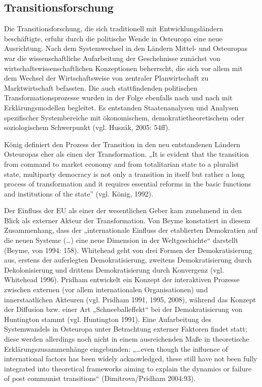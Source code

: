 \subsection{Transitionsforschung}
Die Transitionsforschung, die sich traditionell mit Entwicklungsländern beschäftigte, erfuhr durch die politische Wende in Osteuropa eine neue Ausrichtung. Nach dem Systemwechsel in den Ländern Mittel- und Osteuropas war die wissenschaftliche Aufarbeitung der Geschehnisse zunächst von wirtschaftswissenschaftlichen Konzeptionen beherrscht, die sich vor allem mit dem Wechsel der Wirtschaftsweise von zentraler Planwirtschaft zu Marktwirtschaft befassten. Die auch stattfindenden politischen Transformationsprozesse wurden in der Folge ebenfalls nach und nach mit Erklärungsmodellen begleitet. Es entstanden Staatenanalysen und Analysen spezifischer Systembereiche mit ökonomischem, demokratietheoretischem oder soziologischem Schwerpunkt (vgl. Huszák, 2005: 54ff).\par
König definiert den Prozess der Transition in den neu entstandenen Ländern Osteuropas eher als einen der Transformation. „It is evident that the transition from command to market economy and from totalitarian state to a pluralist state, multiparty democracy is not only a transition in itself but rather a long process of transformation and it requires essential reforms in the basic functions and institutions of the state” (vgl. König, 1992). \par
Der Einfluss der EU als einer der wesentlichen Geber kam zunehmend in den Blick als externer Akteur der Transformation. Von Beyme konstatiert in diesem Zusammenhang, dass der „internationale Einfluss der etablierten Demokratien auf die neuen Systeme (…) eine neue Dimension in der Weltgeschichte“ darstellt (Beyme, von 1994: 158). Whitehead geht von drei Formen der Demokratisierung aus, erstens der auferlegten Demokratisierung, zweitens Demokratisierung durch Dekolonisierung und drittens Demokratisierung durch Konvergenz (vgl. Whitehead 1996). Pridham entwickelt ein Konzept der interaktiven Prozesse zwischen externen (vor allem internationalen Organisationen) und innerstaatlichen Akteuren (vgl. Pridham 1991, 1995, 2008), während das Konzept der Diffusion bzw. einer Art „Schneeballeffekt“ bei der Demokratisierung von Huntington stammt (vgl. Huntington 1991). Eine Aufarbeitung des Systemwandels in Osteuropa unter Betrachtung externer Faktoren findet statt; diese werden allerdings noch nicht in einem ausreichenden Maße in theoretische Erklärungszusammenhänge eingebunden: „…even though the influence of international factors has been widely acknowledged, these still have not been fully integrated into theoretical frameworks aiming to explain the dynamics or failure of post communist transitions“ (Dimitrova/Pridham 2004:93).\par
